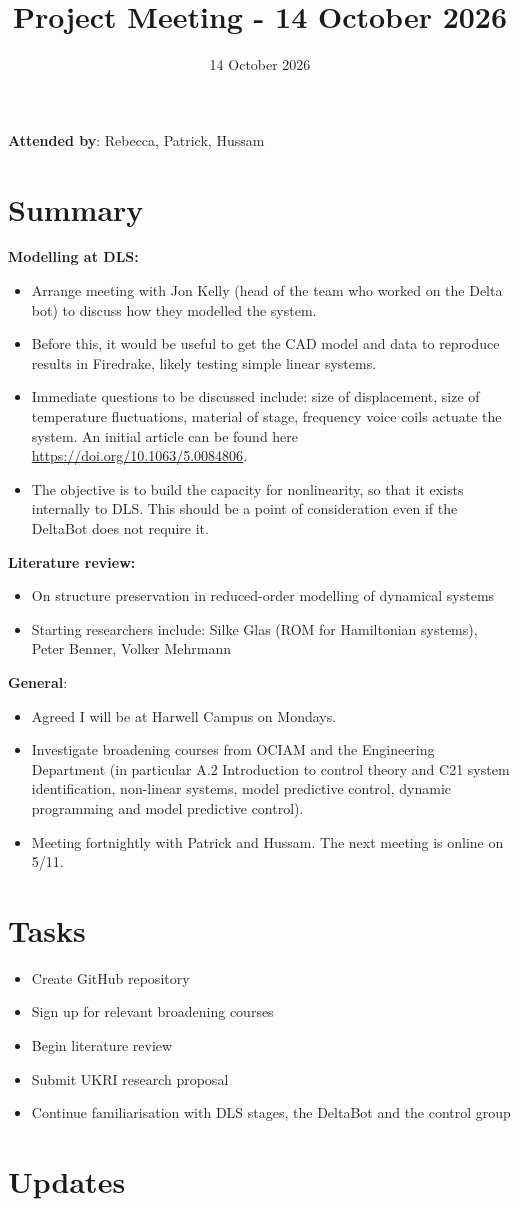 \documentclass{article}
\title{Project Meeting - 14 October 2026}
\date{14 October 2026}
\begin{document}
\maketitle

\textbf{Attended by}: Rebecca, Patrick, Hussam

\section{Summary}
\textbf{Modelling at DLS:}
\begin{itemize}
    \item Arrange meeting with Jon Kelly (head of the team who worked on the Delta bot) to discuss how they modelled the system. 
    \item Before this, it would be useful to get the CAD model and data to reproduce results in Firedrake, likely testing simple linear systems. 
    \item Immediate questions to be discussed include: size of displacement, size of temperature fluctuations, material of stage, frequency voice coils actuate the system. An initial article can be found here \url{https://doi.org/10.1063/5.0084806}.
    \item The objective is to build the capacity for nonlinearity, so that it exists internally to DLS. This should be a point of consideration even if the DeltaBot does not require it.
\end{itemize}
\textbf{Literature review:}
\begin{itemize}
    \item On structure preservation in reduced-order modelling of dynamical systems
    \item Starting researchers include: Silke Glas (ROM for Hamiltonian systems), Peter Benner, Volker Mehrmann
\end{itemize}
\textbf{General}:
\begin{itemize}
    \item Agreed I will be at Harwell Campus on Mondays.
    \item Investigate broadening courses from OCIAM and the Engineering Department (in particular A.2 Introduction to control theory and C21 system identification, non-linear systems, model predictive control, dynamic programming and model predictive control).
    \item Meeting fortnightly with Patrick and Hussam. The next meeting is online on 5/11.
\end{itemize}

\section{Tasks}
\begin{itemize}
    \item Create GitHub repository
    \item Sign up for relevant broadening courses
    \item Begin literature review
    \item Submit UKRI research proposal
    \item Continue familiarisation with DLS stages, the DeltaBot and the control group
\end{itemize}

\section{Updates}
\end{document}
